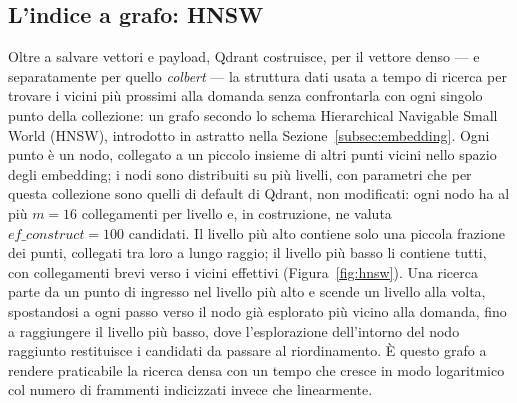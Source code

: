 \subsection{L'indice a grafo: HNSW}

Oltre a salvare vettori e payload, Qdrant costruisce, per il vettore denso --- e separatamente per quello
\emph{colbert} --- la struttura dati usata a tempo di ricerca per trovare i vicini più prossimi alla domanda senza
confrontarla con ogni singolo punto della collezione: un grafo secondo lo schema Hierarchical Navigable Small World
(HNSW), introdotto in astratto nella Sezione~\ref{subsec:embedding}. Ogni punto è un nodo, collegato a un piccolo
insieme di altri punti vicini nello spazio degli embedding; i nodi sono distribuiti su più livelli, con parametri
che per questa collezione sono quelli di default di Qdrant, non modificati: ogni nodo ha al più $m=16$ collegamenti
per livello e, in costruzione, ne valuta $\mathit{ef\_construct}=100$ candidati. Il livello più alto contiene solo
una piccola frazione dei punti, collegati tra loro a lungo raggio; il livello più basso li contiene tutti, con
collegamenti brevi verso i vicini effettivi (Figura~\ref{fig:hnsw}). Una ricerca parte da un punto di ingresso nel
livello più alto e scende un livello alla volta, spostandosi a ogni passo verso il nodo già esplorato più vicino
alla domanda, fino a raggiungere il livello più basso, dove l'esplorazione dell'intorno del nodo raggiunto
restituisce i candidati da passare al riordinamento. È questo grafo a rendere praticabile la ricerca densa
con un tempo che cresce in modo logaritmico col numero di frammenti indicizzati
invece che linearmente.

